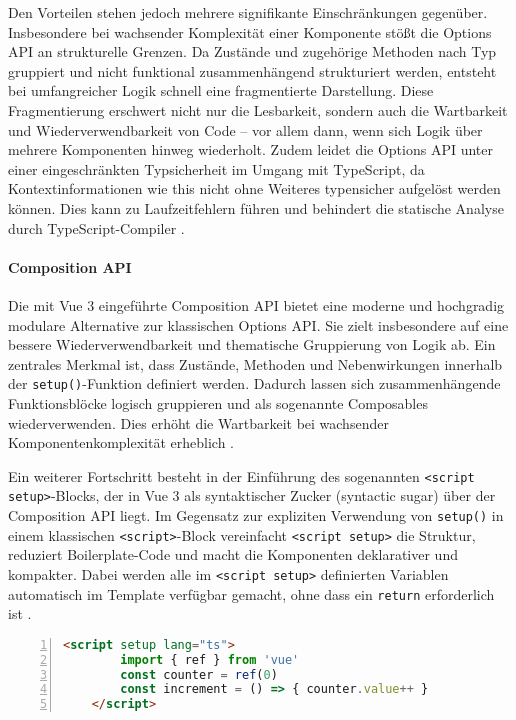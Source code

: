 Den Vorteilen stehen jedoch mehrere signifikante Einschränkungen gegenüber. Insbesondere bei wachsender Komplexität einer Komponente stößt die Options API an strukturelle Grenzen. Da Zustände und zugehörige Methoden nach Typ gruppiert und nicht funktional zusammenhängend strukturiert werden, entsteht bei umfangreicher Logik schnell eine fragmentierte Darstellung. Diese Fragmentierung erschwert nicht nur die Lesbarkeit, sondern auch die Wartbarkeit und Wiederverwendbarkeit von Code – vor allem dann, wenn sich Logik über mehrere Komponenten hinweg wiederholt. Zudem leidet die Options API unter einer eingeschränkten Typsicherheit im Umgang mit TypeScript, da Kontextinformationen wie this nicht ohne Weiteres typensicher aufgelöst werden können. Dies kann zu Laufzeitfehlern führen und behindert die statische Analyse durch TypeScript-Compiler \cite{VueGuide2024}.

\paragraph{Composition API}
Die mit Vue 3 eingeführte Composition API bietet eine moderne und hochgradig modulare Alternative zur klassischen Options API. Sie zielt insbesondere auf eine bessere Wiederverwendbarkeit und thematische Gruppierung von Logik ab. Ein zentrales Merkmal ist, dass Zustände, Methoden und Nebenwirkungen innerhalb der \texttt{setup()}-Funktion definiert werden. Dadurch lassen sich zusammenhängende Funktionsblöcke logisch gruppieren und als sogenannte Composables wiederverwenden. Dies erhöht die Wartbarkeit bei wachsender Komponentenkomplexität erheblich \cite{CompositionAPIFAQ}.

Ein weiterer Fortschritt besteht in der Einführung des sogenannten \texttt{<script setup>}-Blocks, der in Vue 3 als syntaktischer Zucker (syntactic sugar) über der Composition API liegt. Im Gegensatz zur expliziten Verwendung von \texttt{setup()} in einem klassischen \texttt{<script>}-Block vereinfacht \texttt{<script setup>} die Struktur, reduziert Boilerplate-Code und macht die Komponenten deklarativer und kompakter. Dabei werden alle im \texttt{<script setup>} definierten Variablen automatisch im Template verfügbar gemacht, ohne dass ein \texttt{return} erforderlich ist \cite{ScriptSetup}.
\newpage
\begin{lstlisting}[caption=Beispiel für die Composition API mit \texttt{<script setup>},numbers=left,label=lst:scriptsetup,language=html]
	<script setup lang="ts"> 
		import { ref } from 'vue' 
		const counter = ref(0) 
		const increment = () => { counter.value++ } 
	</script>
	\end{lstlisting}

